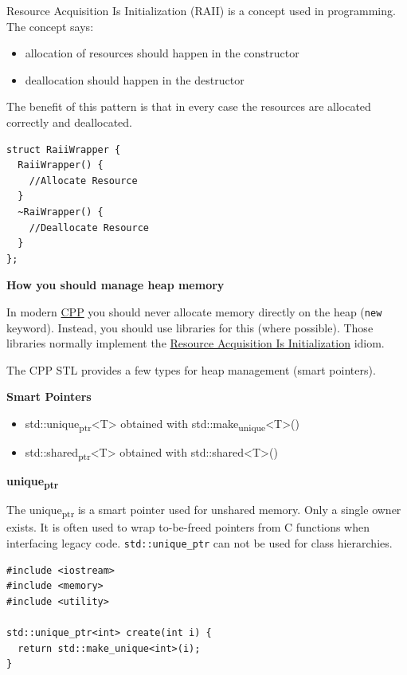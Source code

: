 \documentclass[11pt,twoside,landscape]{article}
\begin{document}
\begin{multicols}{3}
Resource Acquisition Is Initialization (RAII) is a concept used in programming.
The concept says:
\begin{itemize}
\item allocation of resources should happen in the constructor
\item deallocation should happen in the destructor
\end{itemize}


The benefit of this pattern is that in every case the resources are allocated correctly and deallocated.


\lstset{language=c++,label= ,caption= ,captionpos=b,numbers=none}
\begin{lstlisting}
struct RaiiWrapper {
  RaiiWrapper() {
    //Allocate Resource
  }
  ~RaiWrapper() {
    //Deallocate Resource
  }
};
\end{lstlisting}

\textbf{How you should manage heap memory}

In modern \href{../../../roam/20210920103243-c.org}{CPP} you should never allocate memory directly on the heap (\texttt{new} keyword).
Instead, you should use libraries for this (where possible).
Those libraries normally implement the \href{../../../roam/20220118172628-resource_acquisition_is_initialization.org}{Resource Acquisition Is Initialization} idiom.

The CPP STL provides a few types for heap management (smart pointers).

\textbf{Smart Pointers}

\begin{itemize}
\item std::unique\textsubscript{ptr}<T> obtained with std::make\textsubscript{unique}<T>()
\item std::shared\textsubscript{ptr}<T> obtained with std::shared<T>()
\end{itemize}


\textbf{unique\textsubscript{ptr}}

The unique\textsubscript{ptr} is a smart pointer used for unshared memory.
Only a single owner exists.
It is often used to wrap to-be-freed pointers from C functions when interfacing legacy code.
\texttt{std::unique\_ptr} can not be used for class hierarchies.


\lstset{language=c++,label= ,caption= ,captionpos=b,numbers=none}
\begin{lstlisting}
#include <iostream>
#include <memory>
#include <utility>

std::unique_ptr<int> create(int i) {
  return std::make_unique<int>(i);
}


\end{lstlisting}
\end{multicols}
\end{document}
